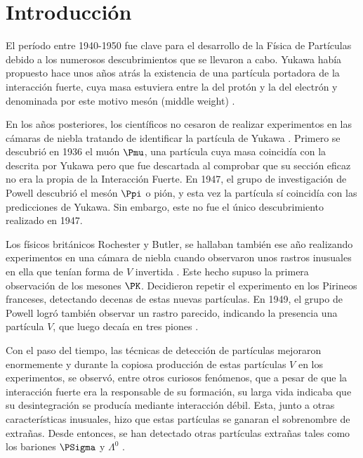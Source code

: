 \renewcommand{\listtablename}{Índice de tablas}
\renewcommand{\tablename}{Tabla}

\chapter{Introducción}\label{cap:intro}
El período entre 1940-1950 fue clave para el desarrollo de la Física de Partículas debido a los numerosos descubrimientos que se llevaron a cabo. Yukawa había propuesto hace unos años atrás la existencia de una partícula portadora de la interacción fuerte, cuya masa estuviera entre la del protón y la del electrón y denominada por este motivo mesón (middle weight) \cite{Griffiths2008}.
 
En los años posteriores, los científicos no cesaron de realizar experimentos en las cámaras de niebla tratando de identificar la partícula de Yukawa \cite{Lattes}. Primero se descubrió en 1936 el muón $\Pmu$, una partícula cuya masa coincidía con la descrita por Yukawa pero que fue descartada al comprobar que su sección eficaz no era la propia de la Interacción Fuerte. En 1947, el grupo de investigación de Powell descubrió el mesón $\Ppi$ o pión, y esta vez la partícula sí coincidía con las predicciones de Yukawa. Sin embargo, este no fue el único descubrimiento realizado en 1947.

Los físicos británicos Rochester y Butler, se hallaban también ese año realizando experimentos en una cámara de niebla cuando observaron unos rastros inusuales en ella que tenían forma de $V$ invertida \cite{Nature1}. Este hecho supuso la primera observación de los mesones $\PK$. Decidieron repetir el experimento en los Pirineos franceses, detectando decenas de estas nuevas partículas. En 1949, el grupo de Powell logró también observar un rastro parecido, indicando la presencia una partícula $V$, que luego decaía en tres piones \cite{Powell}. 

Con el paso del tiempo, las técnicas de detección de partículas mejoraron enormemente y durante la copiosa producción de estas partículas $V$ en los experimentos, se observó, entre otros curiosos fenómenos, que a pesar de que la interacción fuerte era la responsable de su formación, su larga vida indicaba que su desintegración se producía mediante interacción débil. Esta, junto a otras características inusuales, hizo que estas partículas se ganaran el sobrenombre de extrañas. Desde entonces, se han detectado otras partículas extrañas tales como los bariones $\PSigma$ y $\Lambda^0$ \cite{Bardeen2012}.

